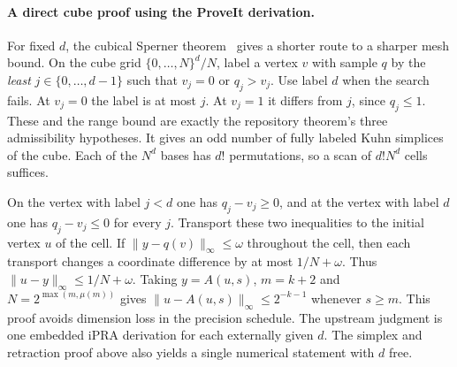 \documentclass[11pt,letterpaper]{article}
\newcommand{\norm}[1]{\lVert #1\rVert_\infty}
\theoremstyle{claim}\newtheorem{theorem}{Theorem}\newtheorem{lemma}[theorem]{Lemma}
\begin{document}
\paragraph{A direct cube proof using the ProveIt derivation.}
For fixed $d$, the cubical Sperner theorem~\cite{cubeprovider} gives a shorter
route to a sharper mesh bound. On the cube grid $\{0,\ldots,N\}^d/N$,
label a vertex $v$ with sample $q$ by the \emph{least} $j\in\{0,\ldots,d-1\}$
such that $v_j=0$ or $q_j>v_j$. Use label $d$ when the search fails.
At $v_j=0$ the label is at most $j$. At $v_j=1$ it differs from $j$,
since $q_j\le1$. These and the range bound are exactly the repository
theorem's three admissibility hypotheses. It gives an odd number of fully
labeled Kuhn simplices of the cube. Each of the $N^d$ bases has $d!$
permutations, so a scan of $d!N^d$ cells suffices.

On the vertex with label $j<d$ one has $q_j-v_j\ge0$, and at the
vertex with label $d$ one has $q_j-v_j\le0$ for every $j$.
Transport these two inequalities to the initial vertex $u$ of the cell.
If $\norm{y-q(v)}\le\omega$ throughout the cell, then each transport
changes a coordinate difference by at most $1/N+\omega$.
Thus $\norm{u-y}\le1/N+\omega$. Taking $y=A(u,s)$, $m=k+2$ and
$N=2^{\max(m,\mu(m))}$ gives $\norm{u-A(u,s)}\le2^{-k-1}$ whenever
$s\ge m$. This proof avoids dimension loss in the precision schedule.
The upstream judgment is one embedded iPRA derivation for each externally
given $d$. The simplex and retraction proof above also yields a single
numerical statement with $d$ free.
\end{document}

